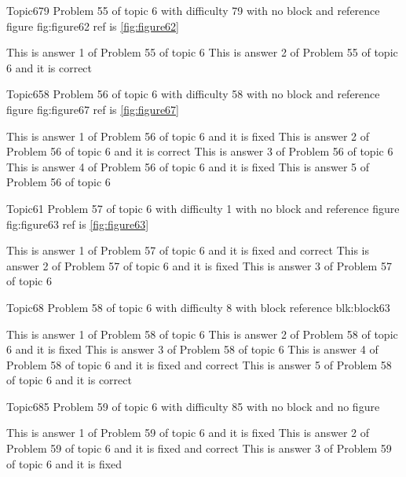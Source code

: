 \documentclass[master]{exam}
\begin{document}
\begin{problem}{Topic6}{79}
	Problem 55 of topic 6 with difficulty 79 with no block and reference figure fig:figure62 ref is \ref{fig:figure62}
	\begin{answers}
		\answer This is answer 1 of Problem 55 of topic 6 
		\answer[correct] This is answer 2 of Problem 55 of topic 6 and it is correct
	\end{answers}
\end{problem}

\begin{problem}{Topic6}{58}
	Problem 56 of topic 6 with difficulty 58 with no block and reference figure fig:figure67 ref is \ref{fig:figure67}
	\begin{answers}
		\answer[fixed] This is answer 1 of Problem 56 of topic 6 and it is fixed
		\answer[correct] This is answer 2 of Problem 56 of topic 6 and it is correct
		\answer This is answer 3 of Problem 56 of topic 6 
		\answer[fixed] This is answer 4 of Problem 56 of topic 6 and it is fixed
		\answer This is answer 5 of Problem 56 of topic 6 
	\end{answers}
\end{problem}

\begin{problem}{Topic6}{1}
	Problem 57 of topic 6 with difficulty 1 with no block and reference figure fig:figure63 ref is \ref{fig:figure63}
	\begin{answers}
		 This is answer 1 of Problem 57 of topic 6 and it is fixed and correct
		\answer[fixed] This is answer 2 of Problem 57 of topic 6 and it is fixed
		\answer This is answer 3 of Problem 57 of topic 6 
	\end{answers}
\end{problem}

\begin{problem}[requires=blk:block63]{Topic6}{8}
	Problem 58 of topic 6 with difficulty 8 with block reference blk:block63
	\begin{answers}
		\answer This is answer 1 of Problem 58 of topic 6 
		\answer[fixed] This is answer 2 of Problem 58 of topic 6 and it is fixed
		\answer This is answer 3 of Problem 58 of topic 6 
		 This is answer 4 of Problem 58 of topic 6 and it is fixed and correct
		\answer[correct] This is answer 5 of Problem 58 of topic 6 and it is correct
	\end{answers}
\end{problem}

\begin{problem}{Topic6}{85}
	Problem 59 of topic 6 with difficulty 85 with no block and no figure
	\begin{answers}
		\answer[fixed] This is answer 1 of Problem 59 of topic 6 and it is fixed
		 This is answer 2 of Problem 59 of topic 6 and it is fixed and correct
		\answer[fixed] This is answer 3 of Problem 59 of topic 6 and it is fixed
	\end{answers}
\end{problem}
\end{document}
